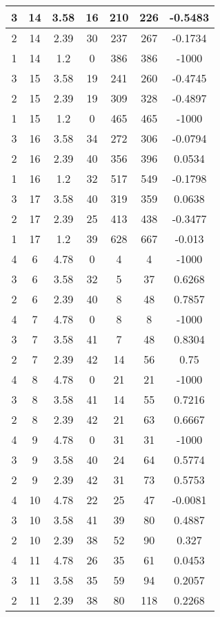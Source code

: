 \documentclass[letterpaper, 12pt]{article}
\begin{document}
\begin{longtable}{|c|c|c|c|c|c|c|}
\hline
3 & 14 & 3.58 & 16 & 210 & 226 & -0.5483 \\
\hline
2 & 14 & 2.39 & 30 & 237 & 267 & -0.1734 \\
\hline
1 & 14 & 1.2 & 0 & 386 & 386 & -1000 \\
\hline
3 & 15 & 3.58 & 19 & 241 & 260 & -0.4745 \\
\hline
2 & 15 & 2.39 & 19 & 309 & 328 & -0.4897 \\
\hline
1 & 15 & 1.2 & 0 & 465 & 465 & -1000 \\
\hline
3 & 16 & 3.58 & 34 & 272 & 306 & -0.0794 \\
\hline
2 & 16 & 2.39 & 40 & 356 & 396 & 0.0534 \\
\hline
1 & 16 & 1.2 & 32 & 517 & 549 & -0.1798 \\
\hline
3 & 17 & 3.58 & 40 & 319 & 359 & 0.0638 \\
\hline
2 & 17 & 2.39 & 25 & 413 & 438 & -0.3477 \\
\hline
1 & 17 & 1.2 & 39 & 628 & 667 & -0.013 \\
\hline
4 & 6 & 4.78 & 0 & 4 & 4 & -1000 \\
\hline
3 & 6 & 3.58 & 32 & 5 & 37 & 0.6268 \\
\hline
2 & 6 & 2.39 & 40 & 8 & 48 & 0.7857 \\
\hline
4 & 7 & 4.78 & 0 & 8 & 8 & -1000 \\
\hline
3 & 7 & 3.58 & 41 & 7 & 48 & 0.8304 \\
\hline
2 & 7 & 2.39 & 42 & 14 & 56 & 0.75 \\
\hline
4 & 8 & 4.78 & 0 & 21 & 21 & -1000 \\
\hline
3 & 8 & 3.58 & 41 & 14 & 55 & 0.7216 \\
\hline
2 & 8 & 2.39 & 42 & 21 & 63 & 0.6667 \\
\hline
4 & 9 & 4.78 & 0 & 31 & 31 & -1000 \\
\hline
3 & 9 & 3.58 & 40 & 24 & 64 & 0.5774 \\
\hline
2 & 9 & 2.39 & 42 & 31 & 73 & 0.5753 \\
\hline
4 & 10 & 4.78 & 22 & 25 & 47 & -0.0081 \\
\hline
3 & 10 & 3.58 & 41 & 39 & 80 & 0.4887 \\
\hline
2 & 10 & 2.39 & 38 & 52 & 90 & 0.327 \\
\hline
4 & 11 & 4.78 & 26 & 35 & 61 & 0.0453 \\
\hline
3 & 11 & 3.58 & 35 & 59 & 94 & 0.2057 \\
\hline
2 & 11 & 2.39 & 38 & 80 & 118 & 0.2268 \\

\end{longtable}
\end{document}
